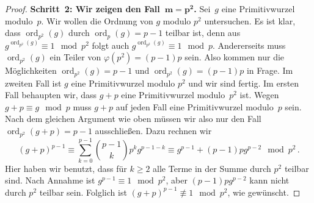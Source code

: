 \begin{proof}
	\textbf{Schritt~2: Wir zeigen den Fall~$\boldsymbol{m=p^2}$.} Sei~$g$ eine Primitivwurzel modulo~$p$. Wir wollen die Ordnung von $g$ modulo $p^2$ untersuchen. Es ist klar, dass $\operatorname{ord}_{p^2}(g)$ durch $\operatorname{ord}_p(g)=p-1$ teilbar ist, denn aus $g^{\operatorname{ord}_{p^2}(g)}\equiv 1\mod p^2$ folgt auch $g^{\operatorname{ord}_{p^2}(g)}\equiv 1\mod p$. Andererseits muss $\operatorname{ord}_{p^2}(g)$ ein Teiler von $\varphi(p^2)=(p-1)p$ sein. Also kommen nur die Möglichkeiten $\operatorname{ord}_{p^2}(g)=p-1$ und $\operatorname{ord}_{p^2}(g)=(p-1)p$ in Frage. Im zweiten Fall ist $g$ eine Primitivwurzel modulo $p^2$ und wir sind fertig. Im ersten Fall behaupten wir, dass $g+p$ eine Primitivwurzel modulo~$p^2$ ist. Wegen $g+p\equiv g\mod p$ muss $g+p$ auf jeden Fall eine Primitivwurzel modulo~$p$ sein. Nach dem gleichen Argument wie oben müssen wir also nur den Fall $\operatorname{ord}_{p^2}(g+p)=p-1$ ausschließen. Dazu rechnen wir
	\begin{equation*}
		(g+p)^{p-1}\equiv \sum_{k=0}^{p-1}\binom{p-1}{k}p^kg^{p-1-k}\equiv g^{p-1}+(p-1)pg^{p-2}\mod p^2\,.
	\end{equation*}
	Hier haben wir benutzt, dass für $k\geqslant 2$ alle Terme in der Summe durch $p^2$ teilbar sind. Nach Annahme ist $g^{p-1}\equiv 1\mod p^2$, aber $(p-1)pg^{p-2}$ kann nicht durch $p^2$ teilbar sein. Folglich ist $(g+p)^{p-1}\not\equiv 1\mod p^2$, wie gewünscht.
	

\end{proof}
